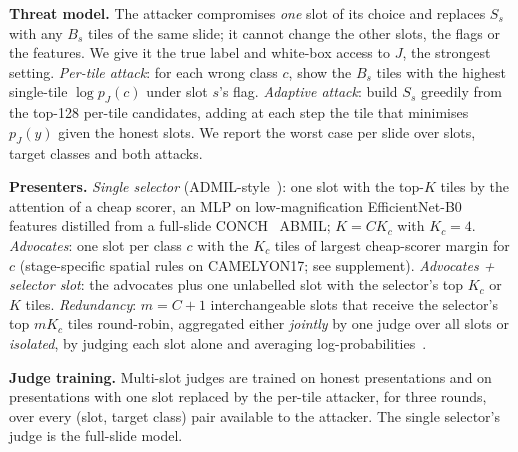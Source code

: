 \documentclass[runningheads]{llncs}
\begin{document}
\textbf{Threat model.} The attacker compromises \emph{one} slot of its choice and replaces $S_s$ with any $B_s$ tiles of the same slide; it cannot change the other slots, the flags or the features. We give it the true label and white-box access to $J$, the strongest setting. \emph{Per-tile attack}: for each wrong class $c$, show the $B_s$ tiles with the highest single-tile $\log p_J(c)$ under slot $s$'s flag. \emph{Adaptive attack}: build $S_s$ greedily from the top-128 per-tile candidates, adding at each step the tile that minimises $p_J(y)$ given the honest slots. We report the worst case per slide over slots, target classes and both attacks.

\textbf{Presenters.} \emph{Single selector} (ADMIL-style~\cite{admil2026}): one slot with the top-$K$ tiles by the attention of a cheap scorer, an MLP on low-magnification EfficientNet-B0~\cite{tan2019efficientnet} features distilled from a full-slide CONCH~\cite{conch} ABMIL; $K=C K_c$ with $K_c=4$. \emph{Advocates}: one slot per class $c$ with the $K_c$ tiles of largest cheap-scorer margin for $c$ (stage-specific spatial rules on CAMELYON17; see supplement). \emph{Advocates + selector slot}: the advocates plus one unlabelled slot with the selector's top $K_c$ or $K$ tiles. \emph{Redundancy}: $m=C{+}1$ interchangeable slots that receive the selector's top $mK_c$ tiles round-robin, aggregated either \emph{jointly} by one judge over all slots or \emph{isolated}, by judging each slot alone and averaging log-probabilities~\cite{xiang2024robustrag}.

\textbf{Judge training.} Multi-slot judges are trained on honest presentations and on presentations with one slot replaced by the per-tile attacker, for three rounds, over every (slot, target class) pair available to the attacker. The single selector's judge is the full-slide model.
\end{document}
